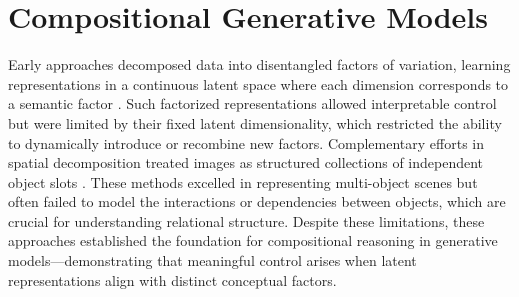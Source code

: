 
\section{Compositional Generative Models}
\label{sec:compositionality_models}


Early approaches decomposed data into disentangled factors of variation, learning representations in a continuous latent space where each dimension corresponds to a semantic factor \citep{higgins2017scan,generative_models_visually_grounded_imagination_2018}.  
Such factorized representations allowed interpretable control but were limited by their fixed latent dimensionality, which restricted the ability to dynamically introduce or recombine new factors.  
Complementary efforts in spatial decomposition treated images as structured collections of independent object slots \citep{steenkiste2019a,multi_object_representation_learning_iterative_variational_inference_2019}.  
These methods excelled in representing multi-object scenes but often failed to model the interactions or dependencies between objects, which are crucial for understanding relational structure.  
Despite these limitations, these approaches established the foundation for compositional reasoning in generative models—demonstrating that meaningful control arises when latent representations align with distinct conceptual factors.

